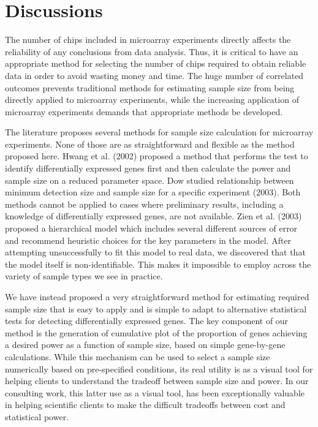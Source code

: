 \documentclass{bioinfo}
\begin{document}
\section{Discussions}

The number of chips included in microarray experiments directly
affects the reliability of any conclusions from data analysis.
Thus, it is critical to have an appropriate method for selecting
the number of chips required to obtain reliable data in order to
avoid wasting money and time. The huge number of correlated
outcomes prevents traditional methods for estimating sample size
from being directly applied to microarray experiments, while the
increasing application of microarray experiments demands that
appropriate methods be developed.

The literature proposes several methods for sample size
calculation for microarray experiments. None of those are as
straightforward and flexible as the method proposed here. Hwang et
al. (2002) proposed a method that performs the test to identify
differentially expressed genes first and then calculate the power
and sample size on a reduced parameter space. Dow studied
relationship between minimum detection size and sample size for a
specific experiment (2003). Both methods cannot be applied to
cases where preliminary results, including a knowledge of
differentially expressed genes, are not available. Zien et al.
(2003) proposed a hierarchical model which includes several
different sources of error and recommend heuristic choices for the
key parameters in the model.  After attempting unsuccessfully to
fit this model to real data, we discovered that that the model
itself is non-identifiable.  This makes it impossible to employ
across the variety of sample types we see in practice.

We have instead proposed a very straightforward method for
estimating required sample size that is easy to apply and is
simple to adapt to alternative statistical tests for detecting
differentially expressed genes. The key component of our method is
the generation of cumulative plot of the proportion of genes
achieving a desired power as a function of sample size, based on
simple gene-by-gene calculations.  While this mechanism can be
used to select a sample size numerically based on pre-specified
conditions, its real utility is as a visual tool for helping
clients to understand the tradeoff between sample size and power.
In our consulting work, this latter use as a visual tool, has been
exceptionally valuable in helping scientific clients to make the
difficult tradeoffs between cost and statistical power.
\end{document}
